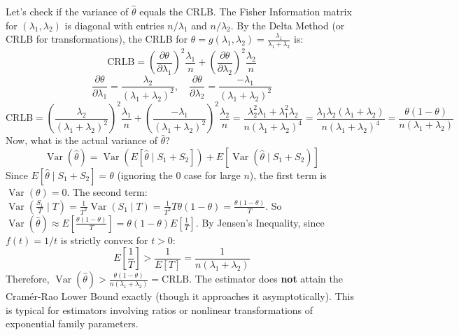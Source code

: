 \begin{solution}
Let's check if the variance of $\hat{\theta}$ equals the CRLB.
The Fisher Information matrix for $(\lambda_1, \lambda_2)$ is diagonal with entries $n/\lambda_1$ and $n/\lambda_2$.
By the Delta Method (or CRLB for transformations), the CRLB for $\theta = g(\lambda_1, \lambda_2) = \frac{\lambda_1}{\lambda_1+\lambda_2}$ is:
\[ \text{CRLB} = \left(\frac{\partial \theta}{\partial \lambda_1}\right)^2 \frac{\lambda_1}{n} + \left(\frac{\partial \theta}{\partial \lambda_2}\right)^2 \frac{\lambda_2}{n} \]
\[ \frac{\partial \theta}{\partial \lambda_1} = \frac{\lambda_2}{(\lambda_1+\lambda_2)^2}, \quad \frac{\partial \theta}{\partial \lambda_2} = \frac{-\lambda_1}{(\lambda_1+\lambda_2)^2} \]
\[ \text{CRLB} = \left( \frac{\lambda_2}{(\lambda_1+\lambda_2)^2} \right)^2 \frac{\lambda_1}{n} + \left( \frac{-\lambda_1}{(\lambda_1+\lambda_2)^2} \right)^2 \frac{\lambda_2}{n} = \frac{\lambda_2^2 \lambda_1 + \lambda_1^2 \lambda_2}{n(\lambda_1+\lambda_2)^4} = \frac{\lambda_1 \lambda_2 (\lambda_1+\lambda_2)}{n(\lambda_1+\lambda_2)^4} = \frac{\theta(1-\theta)}{n(\lambda_1+\lambda_2)} \]
Now, what is the actual variance of $\hat{\theta}$?
\[ \operatorname{Var}(\hat{\theta}) = \operatorname{Var}(E[\hat{\theta} \mid S_1+S_2]) + E[\operatorname{Var}(\hat{\theta} \mid S_1+S_2)] \]
Since $E[\hat{\theta} \mid S_1+S_2] = \theta$ (ignoring the 0 case for large $n$), the first term is $\operatorname{Var}(\theta) = 0$.
The second term: $\operatorname{Var}\left(\frac{S_1}{T} \mid T\right) = \frac{1}{T^2} \operatorname{Var}(S_1 \mid T) = \frac{1}{T^2} T \theta(1-\theta) = \frac{\theta(1-\theta)}{T}$.
So $\operatorname{Var}(\hat{\theta}) \approx E\left[ \frac{\theta(1-\theta)}{T} \right] = \theta(1-\theta) E\left[\frac{1}{T}\right]$.
By Jensen's Inequality, since $f(t) = 1/t$ is strictly convex for $t>0$:
\[ E\left[\frac{1}{T}\right] > \frac{1}{E[T]} = \frac{1}{n(\lambda_1+\lambda_2)} \]
Therefore, $\operatorname{Var}(\hat{\theta}) > \frac{\theta(1-\theta)}{n(\lambda_1+\lambda_2)} = \text{CRLB}$.
The estimator does \textbf{not} attain the Cramér-Rao Lower Bound exactly (though it approaches it asymptotically). This is typical for estimators involving ratios or nonlinear transformations of exponential family parameters.
\end{solution}
